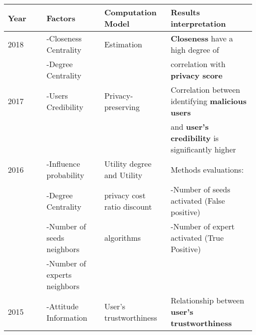 	
\begin{longtable}{lllll}
	Year  & \                                              & \textbf{Factors}                 & \textbf{Computation Model}       & \textbf{Results interpretation}                               \\\hline
	2018  & \cite{alemany_estimation_2018}                 & -Closeness Centrality            & Estimation                       & \textbf{Closeness} have a high degree of                      \\
	\     &                                                & -Degree Centrality               &                                  & correlation with \textbf{privacy score}                       \\\hline
	2017  & \cite{zhang_privacypreserving_2017}            & -Users Credibility               & Privacy-preserving               & Correlation between identifying \textbf{malicious users}      \\
	\     & \                                              & \                                &                                  & and \textbf{user's credibility} is significantly higher       \\\hline
	2016  & \cite{li_algorithm_2016}                       & -Influence probability           & Utility degree and Utility       & Methods evaluations:                                          \\
	\     & \                                              & -Degree Centrality               & privacy cost ratio discount      & -Number of seeds activated (False positive)                   \\
	\     & \                                              & -Number of seeds neighbors       & algorithms                       & -Number of expert activated (True Positive)                   \\
	\     & \                                              & -Number of experts neighbors     &                                  &                                                               \\\hline
	2015  & \cite{pandey_computing_2015}                   & -Attitude Information            & User’s trustworthiness           & Relationship between \textbf{user’s trustworthiness}          \\

\end{longtable}

